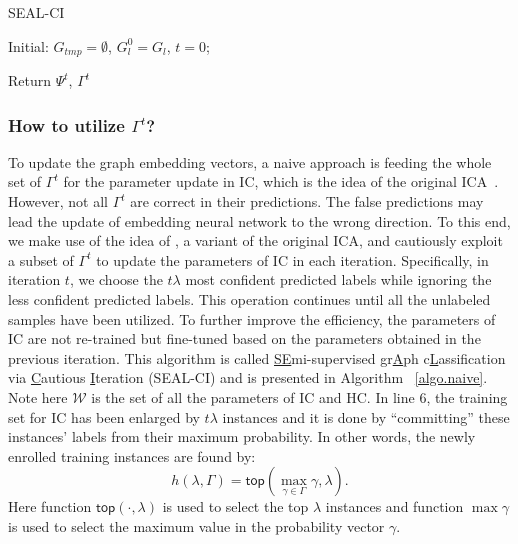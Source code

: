 \documentclass[sigconf]{acmart}
\newcommand{\eat}[1]{}
\begin{document}
\begin{algorithm}[t]
  \caption{SEAL-CI}
  \label{algo.naive}
  Initial: $G_{tmp} =\emptyset$, $G_l^0 = G_l$, $t = 0$;

  Return $\Psi^t$, $\Gamma^t$\;
\end{algorithm}

\subsubsection{How to utilize $\Gamma^t$?}
To update the graph embedding vectors, a naive approach is feeding the whole set of $\Gamma^t$ for the parameter update in IC, which is the idea of the original ICA~\cite{sen2008collective}.  However, not all $\Gamma^t$ are correct in their predictions.  The false predictions may lead the update of embedding neural network to the wrong direction. \eat{Within the set of unlabeled graphs, different $\gamma$ could contribute differently to the update of embedding neural network.} To this end, we make use of the idea of \cite{mcdowell2007cautious}, a variant of the original ICA, and cautiously exploit a subset of $\Gamma^t$ to update the parameters of IC in each iteration.  Specifically, in iteration $t$, we choose the $t\lambda$ most confident predicted labels while ignoring the less confident predicted labels.  This operation continues until all the unlabeled samples have been utilized.  To further improve the efficiency, the parameters of IC are not re-trained but fine-tuned based on the parameters obtained in the previous iteration.  This algorithm is called \underline{SE}mi-supervised gr\underline{A}ph c\underline{L}assification via \underline{C}autious \underline{I}teration (SEAL-CI) and is presented in Algorithm ~\ref{algo.naive}.  Note here $\mathcal{W}$ is the set of all the parameters of IC and HC. \eat{In line $5$, we are sorting $\Gamma$ by its maximum probability.} In line $6$, the training set for IC has been enlarged by $t\lambda$ instances and it is done by ``committing'' these instances' labels from their maximum probability.  In other words, the newly enrolled training instances are found by:
\begin{equation}
  h(\lambda,\Gamma) = \textsf{top}(\max_{\gamma \in \Gamma} \gamma,\lambda).
\end{equation}
Here function $\textsf{top}(\cdot,\lambda)$ is used to select the top $\lambda$ instances and function $\max\gamma$ is used to select the maximum value in the probability vector $\gamma$.  \eat{By ``committing'' these instances, we turn a probability vector into its one-hot form.  For example, it transforms a vector of $(0.1,0.2,0.3,0.4)$ into $(0,0,0,1)$.}
\end{document}
